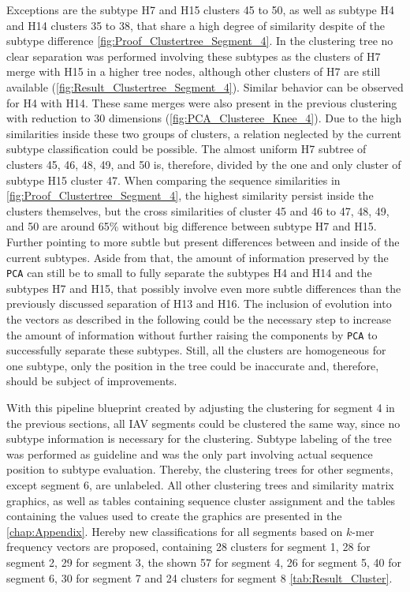 \vspace{1em}

Exceptions are the subtype H7 and H15 clusters 45 to 50, as well as subtype H4 and H14 clusters 35 to 38, that share a high degree of similarity despite of the subtype difference \autoref{fig:Proof_Clustertree_Segment_4}. In the clustering tree no clear separation was performed involving these subtypes as the clusters of H7 merge with H15 in a higher tree nodes, although other clusters of H7 are still available (\autoref{fig:Result_Clustertree_Segment_4}). Similar behavior can be observed for H4 with H14. These same merges were also present in the previous clustering with reduction to 30 dimensions (\autoref{fig:PCA_Clusteree_Knee_4}). Due to the high similarities inside these two groups of clusters, a relation neglected by the current subtype classification could be possible. The almost uniform H7 subtree of clusters 45, 46, 48, 49, and 50 is, therefore, divided by the one and only cluster of subtype H15 cluster 47. When comparing the sequence similarities in \autoref{fig:Proof_Clustertree_Segment_4}, the highest similarity persist inside the clusters themselves, but the cross similarities of cluster 45 and 46 to 47, 48, 49, and 50 are around 65\% without big difference between subtype H7 and H15. Further pointing to more subtle but present differences between and inside of the current subtypes. Aside from that, the amount of information preserved by the \texttt{PCA} can still be to small to fully separate the subtypes H4 and H14 and the subtypes H7 and H15, that possibly involve even more subtle differences than the previously discussed separation of H13 and H16. The inclusion of evolution into the vectors as described in the following could be the necessary step to increase the amount of information without further raising the components by \texttt{PCA} to successfully separate these subtypes. Still, all the clusters are homogeneous for one subtype, only the position in the tree could be inaccurate and, therefore, should be subject of improvements.  

\vspace{1em}

With this pipeline blueprint created by adjusting the clustering for segment 4 in the previous sections, all \gls{IAV} segments could be clustered the same way, since no subtype information is necessary for the clustering. Subtype labeling of the tree was performed as guideline and was the only part involving actual sequence position to subtype evaluation. Thereby, the clustering trees for other segments, except segment 6, are unlabeled. All other clustering trees and similarity matrix graphics, as well as tables containing sequence cluster assignment and the tables containing the values used to create the graphics are presented in the \autoref{chap:Appendix}. Hereby new classifications for all segments based on $k$-mer frequency vectors are proposed, containing 28 clusters for segment 1, 28 for segment 2, 29 for segment 3, the shown 57 for segment 4, 26 for segment 5, 40 for segment 6, 30 for segment 7 and 24 clusters for segment 8 \autoref{tab:Result_Cluster}. 

